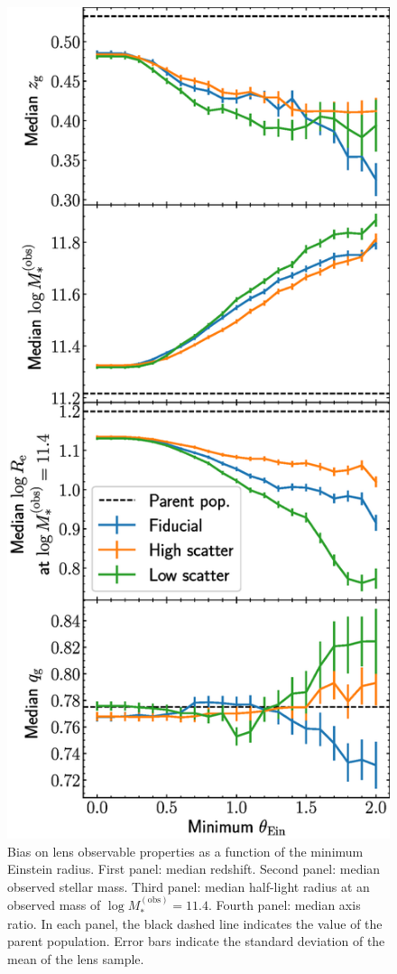 \documentclass{aa}
\def\mobs{M_*^{(\mathrm{obs})}}
\begin{document}
\begin{figure}
\includegraphics[width=\columnwidth]{lens_observable_bias.eps}
\caption{
Bias on lens observable properties as a function of the minimum Einstein radius.
First panel: median redshift.
Second panel: median observed stellar mass.
Third panel: median half-light radius at an observed mass of $\log{\mobs}=11.4$.
Fourth panel: median axis ratio.
In each panel, the black dashed line indicates the value of the parent population.
Error bars indicate the standard deviation of the mean of the lens sample.
\label{fig:lensobsbias}
}
\end{figure}
\end{document}
